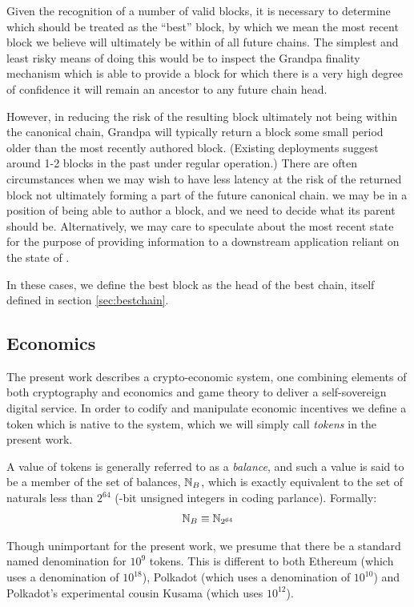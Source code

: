 Given the recognition of a number of valid blocks, it is necessary to determine which should be treated as the ``best'' block, by which we mean the most recent block we believe will ultimately be within of all future \Jam chains. The simplest and least risky means of doing this would be to inspect the Grandpa finality mechanism which is able to provide a block for which there is a very high degree of confidence it will remain an ancestor to any future chain head.

However, in reducing the risk of the resulting block ultimately not being within the canonical chain, Grandpa will typically return a block some small period older than the most recently authored block. (Existing deployments suggest around 1-2 blocks in the past under regular operation.) There are often circumstances when we may wish to have less latency at the risk of the returned block not ultimately forming a part of the future canonical chain. \Eg we may be in a position of being able to author a block, and we need to decide what its parent should be. Alternatively, we may care to speculate about the most recent state for the purpose of providing information to a downstream application reliant on the state of \Jam.

In these cases, we define the best block as the head of the best chain, itself defined in section \ref{sec:bestchain}.

\subsection{Economics}

The present work describes a crypto-economic system, \ie one combining elements of both cryptography and economics and game theory to deliver a self-sovereign digital service. In order to codify and manipulate economic incentives we define a token which is native to the system, which we will simply call \emph{tokens} in the present work.

A value of tokens is generally referred to as a \emph{balance}, and such a value is said to be a member of the set of balances, $\mathbb{N}_B$, which is exactly equivalent to the set of naturals less than $2^{64}$ (-bit unsigned integers in coding parlance). Formally:
\begin{align}\label{eq:balance}
  \mathbb{N}_B \equiv \mathbb{N}_{2^{64}}
\end{align}

Though unimportant for the present work, we presume that there be a standard named denomination for $10^{9}$ tokens. This is different to both Ethereum (which uses a denomination of $10^{18}$), Polkadot (which uses a denomination of $10^{10}$) and Polkadot's experimental cousin Kusama (which uses $10^{12}$).

